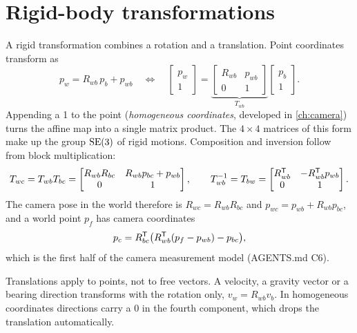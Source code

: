 \section{Rigid-body transformations}

A rigid transformation combines a rotation and a translation. Point coordinates transform as
\begin{equation}
  p_w = R_{wb}\,p_b + p_{wb}
  \quad\Longleftrightarrow\quad
  \begin{bmatrix} p_w \\ 1 \end{bmatrix} = \underbrace{\begin{bmatrix} R_{wb} & p_{wb} \\ 0 & 1 \end{bmatrix}}_{T_{wb}}
  \begin{bmatrix} p_b \\ 1 \end{bmatrix}.
\end{equation}
Appending a 1 to the point (\emph{homogeneous coordinates}, developed in \cref{ch:camera}) turns the affine map into a single matrix product.
The $4\times4$ matrices of this form make up the group $\mathrm{SE}(3)$ of rigid motions. Composition and inversion follow from block multiplication:
\begin{equation}
  T_{wc} = T_{wb}T_{bc} = \begin{bmatrix} R_{wb}R_{bc} & R_{wb}p_{bc} + p_{wb} \\ 0 & 1\end{bmatrix},
  \qquad
  T_{wb}^{-1} = T_{bw} = \begin{bmatrix} R_{wb}^{\mathsf{T}} & -R_{wb}^{\mathsf{T}} p_{wb} \\ 0 & 1 \end{bmatrix}.
  \label{eq:se3-compose}
\end{equation}
The camera pose in the world therefore is $R_{wc} = R_{wb}R_{bc}$ and $p_{wc} = p_{wb} + R_{wb}p_{bc}$, and a world point $p_f$ has camera coordinates
\begin{equation}
  p_c = R_{bc}^{\mathsf{T}}\big(R_{wb}^{\mathsf{T}}(p_f - p_{wb}) - p_{bc}\big),
  \label{eq:world-to-camera}
\end{equation}
which is the first half of the camera measurement model (AGENTS.md C6).

\begin{pitfall}
Translations apply to points, not to free vectors. A velocity, a gravity vector or a bearing direction transforms with the rotation only,
$v_w = R_{wb}v_b$. In homogeneous coordinates directions carry a $0$ in the fourth component, which drops the translation automatically.
\end{pitfall}

